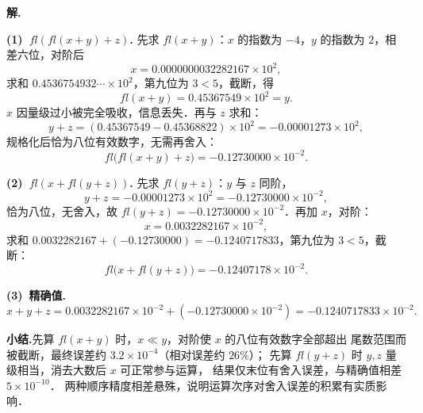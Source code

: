 \documentclass[UTF8,a4paper,11pt]{ctexart}
\begin{document}
\medskip
\noindent\textbf{解.}

\smallskip
\noindent\textbf{(1)~$fl(fl(x+y)+z)$.}\quad
先求 $fl(x+y)$：$x$ 的指数为 $-4$，$y$ 的指数为 $2$，相差六位，对阶后
\[
  x = 0.0000000032282167\times 10^2,
\]
求和 $0.4536754932\cdots\times 10^2$，第九位为 $3<5$，截断，得
\[
  fl(x+y) = 0.45367549\times 10^2 = y.
\]
$x$ 因量级过小被完全吸收，信息丢失．再与 $z$ 求和：
\[
  y + z = (0.45367549 - 0.45368822)\times 10^2 = -0.00001273\times 10^2,
\]
规格化后恰为八位有效数字，无需再舍入：
\[
  fl\bigl(fl(x+y)+z\bigr) = -0.12730000\times 10^{-2}.
\]

\smallskip
\noindent\textbf{(2)~$fl(x+fl(y+z))$.}\quad
先求 $fl(y+z)$：$y$ 与 $z$ 同阶，
\[
  y + z = -0.00001273\times 10^2 = -0.12730000\times 10^{-2},
\]
恰为八位，无舍入，故 $fl(y+z)=-0.12730000\times 10^{-2}$．再加 $x$，对阶：
\[
  x = 0.0032282167\times 10^{-2},
\]
求和 $0.0032282167+(-0.12730000) = -0.1240717833$，第九位为 $3<5$，截断：
\[
  fl\bigl(x+fl(y+z)\bigr) = -0.12407178\times 10^{-2}.
\]

\smallskip
\noindent\textbf{(3)~精确值.}\quad
\[
  x+y+z
  = 0.0032282167\times 10^{-2} + (-0.12730000\times 10^{-2})
  = -0.1240717833\times 10^{-2}.
\]

\smallskip
\noindent\textbf{小结.}\quad 先算 $fl(x+y)$ 时，$x\ll y$，对阶使 $x$ 的八位有效数字全部超出
尾数范围而被截断，最终误差约 $3.2\times 10^{-4}$（相对误差约 $26\%$）；
先算 $fl(y+z)$ 时 $y,z$ 量级相当，消去大数后 $x$ 可正常参与运算，
结果仅末位有舍入误差，与精确值相差 $5\times 10^{-10}$．
两种顺序精度相差悬殊，说明运算次序对舍入误差的积累有实质影响．
\end{document}
